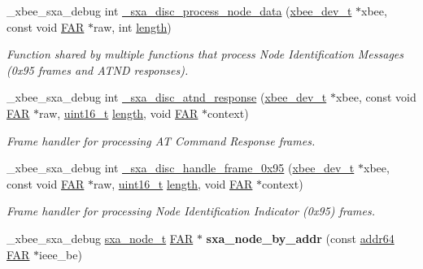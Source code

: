 \begin{DoxyCompactItemize}
\item 
\-\_\-xbee\-\_\-sxa\-\_\-debug int \hyperlink{group___s_x_a_ga9ae9421a9cd885d2299aabb74251cb48}{\-\_\-sxa\-\_\-disc\-\_\-process\-\_\-node\-\_\-data} (\hyperlink{structxbee__dev__t}{xbee\-\_\-dev\-\_\-t} $\ast$xbee, const void \hyperlink{group__hal_gaef060b3456fdcc093a7210a762d5f2ed}{F\-A\-R} $\ast$raw, int \hyperlink{group__zdo_gab2b3adeb2a67e656ff030b56727fd0ac}{length})
\begin{DoxyCompactList}\small\item\em Function shared by multiple functions that process Node Identification Messages (0x95 frames and A\-T\-N\-D responses). \end{DoxyCompactList}\item 
\-\_\-xbee\-\_\-sxa\-\_\-debug int \hyperlink{group___s_x_a_gaaa5cd9591d2c4735e4d9df944323ce17}{\-\_\-sxa\-\_\-disc\-\_\-atnd\-\_\-response} (\hyperlink{structxbee__dev__t}{xbee\-\_\-dev\-\_\-t} $\ast$xbee, const void \hyperlink{group__hal_gaef060b3456fdcc093a7210a762d5f2ed}{F\-A\-R} $\ast$raw, \hyperlink{group__hal_ga5a8b2dc9e45a9ee81a94ef304fb62505}{uint16\-\_\-t} \hyperlink{group__zdo_gab2b3adeb2a67e656ff030b56727fd0ac}{length}, void \hyperlink{group__hal_gaef060b3456fdcc093a7210a762d5f2ed}{F\-A\-R} $\ast$context)
\begin{DoxyCompactList}\small\item\em Frame handler for processing A\-T Command Response frames. \end{DoxyCompactList}\item 
\-\_\-xbee\-\_\-sxa\-\_\-debug int \hyperlink{group___s_x_a_gadd7b9ea8d43a02a15c22957b936c8a71}{\-\_\-sxa\-\_\-disc\-\_\-handle\-\_\-frame\-\_\-0x95} (\hyperlink{structxbee__dev__t}{xbee\-\_\-dev\-\_\-t} $\ast$xbee, const void \hyperlink{group__hal_gaef060b3456fdcc093a7210a762d5f2ed}{F\-A\-R} $\ast$raw, \hyperlink{group__hal_ga5a8b2dc9e45a9ee81a94ef304fb62505}{uint16\-\_\-t} \hyperlink{group__zdo_gab2b3adeb2a67e656ff030b56727fd0ac}{length}, void \hyperlink{group__hal_gaef060b3456fdcc093a7210a762d5f2ed}{F\-A\-R} $\ast$context)
\begin{DoxyCompactList}\small\item\em Frame handler for processing Node Identification Indicator (0x95) frames. \end{DoxyCompactList}\item 
\hypertarget{group___s_x_a_gaf2be09cd0493eb7daf5c1b1d32c2cdf8}{\-\_\-xbee\-\_\-sxa\-\_\-debug \hyperlink{structsxa__node__t}{sxa\-\_\-node\-\_\-t} \hyperlink{group__hal_gaef060b3456fdcc093a7210a762d5f2ed}{F\-A\-R} $\ast$ {\bfseries sxa\-\_\-node\-\_\-by\-\_\-addr} (const \hyperlink{unionaddr64}{addr64} \hyperlink{group__hal_gaef060b3456fdcc093a7210a762d5f2ed}{F\-A\-R} $\ast$ieee\-\_\-be)}\label{group___s_x_a_gaf2be09cd0493eb7daf5c1b1d32c2cdf8}


\end{DoxyCompactItemize}
